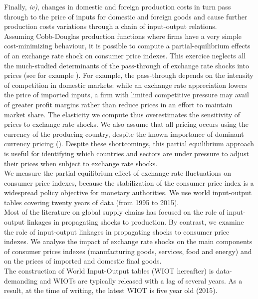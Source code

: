 \documentclass[11pt,a4paper]{article}
\begin{document}
Finally, \textit{iv)}, changes in domestic and foreign production costs in turn pass through to the price of inputs for domestic and foreign goods and cause further production costs variations through a chain of input-output relations.\\
Assuming Cobb-Douglas production functions where firms have a very simple cost-minimizing behaviour, it is possible to compute a partial-equilibrium effects of an exchange rate shock on consumer price indexes.
This exercice neglects all the much-studied determinants of the pass-through of exchange rate shocks into prices (see for example \cite{Berman2012}).
For example, the pass-through depends on the intensity of competition in domestic markets: while an exchange rate appreciation lowers the price of imported inputs, a ﬁrm with limited competitive pressure may avail of greater proﬁt margins rather than reduce prices in an eﬀort to maintain market share.
The elasticity we compute thus overestimates the sensitivity of prices to exchange rate shocks.
We also assume that all pricing occurs using the currency of the producing country, despite the known importance of dominant currency pricing (\cite{Gopinath2020}).
Despite these shortcomings, this partial equilibrium approach is useful for identifying which countries and sectors are under pressure to adjust their prices when subject to exchange rate shocks.\\
We measure the partial equilibrium effect of exchange rate fluctuations on consumer price indexes, because the stabilization of the consumer price index is a widespread policy objective for monetary authorities. We use world input-output tables covering twenty years of data (from 1995 to 2015).\\
Most of the literature on global supply chains has focused on the role of input-output linkages in propagating shocks to production.
By contrast, we examine the role of input-output linkages in propagating shocks to consumer price indexes.
We analyse the impact of exchange rate shocks on the main components of consumer prices indexes (manufacturing goods, services, food and energy) and on the prices of imported and domestic final goods. \\
The construction of World Input-Output tables (WIOT hereafter) is data-demanding and WIOTs are typically released with a lag of several years.
As a result, at the time of writing, the latest WIOT is five year old (2015).
\end{document}
